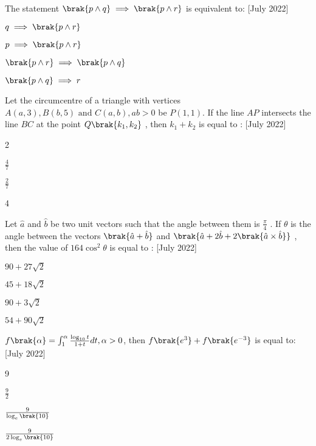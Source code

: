  \item The statement $\brak{p \wedge q} \implies \brak{p \wedge r}$
 is equivalent to: \hfill [July 2022]
 \begin{enumerate}
     \begin{multicols}{2}
         \item $q \implies \brak{p \wedge r}$
         \item $p \implies \brak{p \wedge r}$
         \item $\brak{p \wedge r} \implies \brak{p \wedge q}$
         \item $\brak{p \wedge q} \implies r$
     \end{multicols}
 \end{enumerate}
 \item Let the circumcentre of a triangle with vertices $A(a, 3), B(b, 5) \text{ and } C(a, b), ab > 0 $ be $P(1,1)$. If the line $AP$ intersects the line $ BC$ at the point $Q\brak{k_1,k_2}$
, then $k_1 + k_2$ is equal to : \hfill [July 2022]
\begin{enumerate}
    \begin{multicols}{2}
        \item 2
        \item $\frac{4}{7}$
        \item $\frac{2}{7}$
        \item 4
    \end{multicols}
\end{enumerate}
\item Let $\hat{a}$
 and $\hat{b}$
 be two unit vectors such that the angle between them is 
 $\frac{\pi}{4}$
. If $\theta$
 is the angle between the vectors $\brak{\hat{a} + \hat{b}}$
 and $\brak{\hat{a} + 2\hat{b} + 2\brak{\hat{a}\times \hat{b}}}$
, then the value of $164 \cos^2\theta$
 is equal to : \hfill [July 2022]
 \begin{enumerate}
     \begin{multicols}{2}
         \item $90 + 27 \sqrt{2}$
         \item $45 + 18\sqrt{2}$
         \item $90 + 3\sqrt{2}$
         \item  $54 + 90\sqrt{2}$
     \end{multicols}
 \end{enumerate}
 \item $f\brak{\alpha} = \int_1^{\alpha} \frac{\log_{10}t}{1 + t}dt, \alpha > 0$, then $f\brak{e^3} + f\brak{e^{-3}}$ is equal to: \hfill [July 2022]
 \begin{enumerate}
     \begin{multicols}{4}
     \item 9
     \item $\frac{9}{2}$
    \item $\frac{9}{\log_{e}\brak{10}}$
    \item $\frac{9}{2\log_{e}\brak{10}}$
     \end{multicols}
 \end{enumerate}